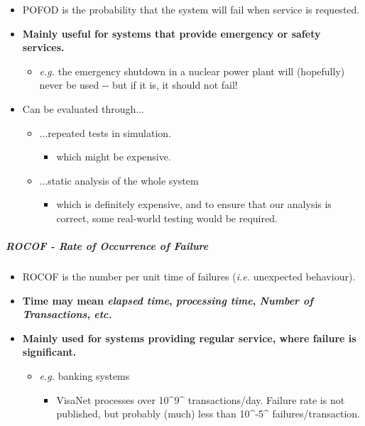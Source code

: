 \documentclass[a4paper]{article}
\providecommand{\tightlist}{%
  \setlength{\itemsep}{0pt}\setlength{\parskip}{0pt}}
\let\oldsubparagraph\subparagraph
\renewcommand{\subparagraph}[1]{\oldsubparagraph{#1}\mbox{}}
\begin{document}
\begin{itemize}
\tightlist
\item
  POFOD is the probability that the system will fail when service is
  requested.
\item
  \textbf{Mainly useful for systems that provide emergency or safety
  services.}

  \begin{itemize}
  \tightlist
  \item
    \emph{e.g.} the emergency shutdown in a nuclear power plant will
    (hopefully) never be used -\/- but if it is, it should not fail!
  \end{itemize}
\item
  Can be evaluated through...

  \begin{itemize}
  \tightlist
  \item
    ...repeated tests in simulation.

    \begin{itemize}
    \tightlist
    \item
      which might be expensive.
    \end{itemize}
  \item
    ...static analysis of the whole system

    \begin{itemize}
    \tightlist
    \item
      which is definitely expensive, and to ensure that our analysis is
      correct, some real-world testing would be required.
    \end{itemize}
  \end{itemize}
\end{itemize}

\hypertarget{rocof---rate-of-occurrence-of-failure}{%
\subparagraph{ROCOF - Rate of Occurrence of
Failure}\label{rocof---rate-of-occurrence-of-failure}}

\begin{itemize}
\tightlist
\item
  ROCOF is the number per unit time of failures (\emph{i.e.} unexpected
  behaviour).
\item
  \textbf{Time may mean \emph{elapsed time}, \emph{processing time},
  \emph{Number of Transactions}, \emph{etc.}}
\item
  \textbf{Mainly used for systems providing regular service, where
  failure is significant.}

  \begin{itemize}
  \tightlist
  \item
    \emph{e.g.} banking systems

    \begin{itemize}
    \tightlist
    \item
      VisaNet processes over 10\^{}9\^{} transactions/day. Failure rate
      is not published, but probably (much) less than 10\^{}-5\^{}
      failures/transaction.
    \end{itemize}
  \end{itemize}
\end{itemize}
\end{document}
